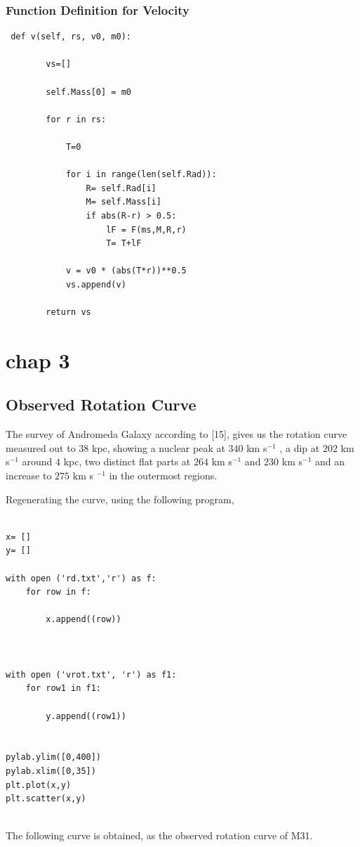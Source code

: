 \subsubsection{Function Definition for Velocity}
\begin{verbatim}
 def v(self, rs, v0, m0):

        vs=[]

        self.Mass[0] = m0

        for r in rs:

            T=0

            for i in range(len(self.Rad)):
                R= self.Rad[i]
                M= self.Mass[i]
                if abs(R-r) > 0.5:
                    lF = F(ms,M,R,r)
                    T= T+lF

            v = v0 * (abs(T*r))**0.5
            vs.append(v)

        return vs
\end{verbatim}
\section{chap 3}
\subsection{Observed Rotation Curve}


The survey of Andromeda Galaxy according to [15], gives us the rotation curve measured out to $38$ kpc, showing a nuclear peak at $340$ km s$^{-1}$ , a dip at $202$ km s$^{-1}$ around $4$ kpc, two distinct flat parts at $264$ km s$^{-1}$  and $230$ km s$^{-1}$ and an increase to $275$  km s $^{-1}$ in the outermost regions.
 
 Regenerating the curve, using the following program,  
\begin{verbatim}

x= []
y= []

with open ('rd.txt','r') as f:
    for row in f:

        x.append((row))



with open ('vrot.txt', 'r') as f1:
    for row1 in f1:

        y.append((row1))


pylab.ylim([0,400])
pylab.xlim([0,35])
plt.plot(x,y)
plt.scatter(x,y)


\end{verbatim}

The following curve is obtained, as the observed rotation curve of M31.

